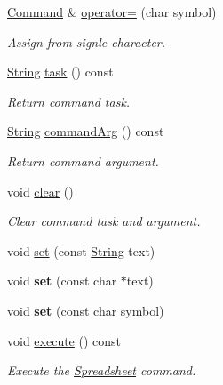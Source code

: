 \begin{DoxyCompactItemize}
\hyperlink{class_command}{Command} \& \hyperlink{class_command_ab9b317d3af1cb59a7c402b9a41b7f624}{operator=} (char symbol)
\begin{DoxyCompactList}\small\item\em Assign from signle character. \end{DoxyCompactList}\item 
\mbox{\label{class_command_aff1c77698af9ba96ece3c7e98d83b0e5}} 
\hyperlink{class_string}{String} \hyperlink{class_command_aff1c77698af9ba96ece3c7e98d83b0e5}{task} () const
\begin{DoxyCompactList}\small\item\em Return command task. \end{DoxyCompactList}\item 
\mbox{\label{class_command_a52a3124585505db25a55fc54d7aec603}} 
\hyperlink{class_string}{String} \hyperlink{class_command_a52a3124585505db25a55fc54d7aec603}{command\+Arg} () const
\begin{DoxyCompactList}\small\item\em Return command argument. \end{DoxyCompactList}\item 
\mbox{\label{class_command_a57fbea0c0d10ef4b184c7ef3eb34590d}} 
void \hyperlink{class_command_a57fbea0c0d10ef4b184c7ef3eb34590d}{clear} ()
\begin{DoxyCompactList}\small\item\em Clear command task and argument. \end{DoxyCompactList}\item 
void \hyperlink{class_command_a9209fc53d344c17fe39e27a3ef5d566f}{set} (const \hyperlink{class_string}{String} text)
\item 
\mbox{\label{class_command_aa13e98e5f35773b360931da7ac6ca504}} 
void {\bfseries set} (const char $\ast$text)
\item 
\mbox{\label{class_command_a73871dc74261367bb8423544018e8d8d}} 
void {\bfseries set} (const char symbol)
\item 
void \hyperlink{class_command_a90eaeb4bfb180ca4cafa61db2b3e0677}{execute} () const
\begin{DoxyCompactList}\small\item\em Execute the \hyperlink{class_spreadsheet}{Spreadsheet} command. \end{DoxyCompactList}\end{DoxyCompactItemize}


